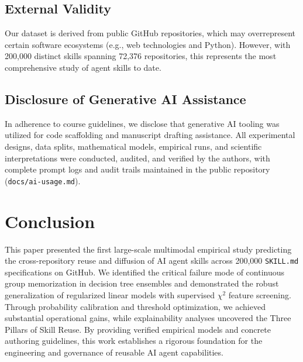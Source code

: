 \documentclass[12pt]{article}
\begin{document}
\subsection{External Validity}
Our dataset is derived from public GitHub repositories, which may overrepresent certain software ecosystems (e.g., web technologies and Python). However, with 200,000 distinct skills spanning 72,376 repositories, this represents the most comprehensive study of agent skills to date.

\subsection{Disclosure of Generative AI Assistance}
In adherence to course guidelines, we disclose that generative AI tooling was utilized for code scaffolding and manuscript drafting assistance. All experimental designs, data splits, mathematical models, empirical runs, and scientific interpretations were conducted, audited, and verified by the authors, with complete prompt logs and audit trails maintained in the public repository (\texttt{docs/ai-usage.md}).

\section{Conclusion}
This paper presented the first large-scale multimodal empirical study predicting the cross-repository reuse and diffusion of AI agent skills across 200,000 \texttt{SKILL.md} specifications on GitHub. We identified the critical failure mode of continuous group memorization in decision tree ensembles and demonstrated the robust generalization of regularized linear models with supervised $\chi^2$ feature screening. Through probability calibration and threshold optimization, we achieved substantial operational gains, while explainability analyses uncovered the Three Pillars of Skill Reuse. By providing verified empirical models and concrete authoring guidelines, this work establishes a rigorous foundation for the engineering and governance of reusable AI agent capabilities.



\end{document}
